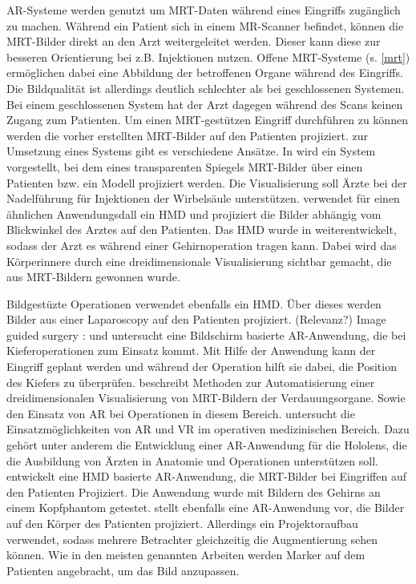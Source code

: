 AR-Systeme werden genutzt um MRT-Daten während eines Eingriffs zugänglich zu machen. Während ein Patient sich in einem MR-Scanner befindet, können die MRT-Bilder direkt an den Arzt weitergeleitet werden. Dieser kann diese zur besseren Orientierung bei z.B. Injektionen nutzen. Offene MRT-Systeme (s. \ref{mrt}) ermöglichen dabei eine Abbildung der betroffenen Organe während des Eingriffs. Die Bildqualität ist allerdings deutlich schlechter als bei geschlossenen Systemen. Bei einem geschlossenen System hat der Arzt dagegen während des Scans keinen Zugang zum Patienten. Um einen MRT-gestützen Eingriff durchführen zu können werden die vorher erstellten MRT-Bilder auf den Patienten projiziert. zur Umsetzung eines Systems gibt es verschiedene Ansätze.
In \cite{Fritz2012} wird ein System vorgestellt, bei dem eines transparenten Spiegels MRT-Bilder über einen Patienten bzw. ein Modell projiziert werden. Die Visualisierung soll Ärzte bei der Nadelführung für Injektionen der Wirbelsäule unterstützen. 
\cite{khamene03} verwendet für einen ähnlichen Anwendungsdall ein HMD und projiziert die Bilder abhängig vom Blickwinkel des Arztes auf den Patienten. Das HMD wurde in \cite{khamene01} weiterentwickelt, sodass der Arzt es während einer Gehirnoperation tragen kann. Dabei wird das Körperinnere durch eine dreidimensionale Visualisierung sichtbar gemacht, die aus MRT-Bildern gewonnen wurde. 

Bildgestüzte Operationen 
\cite{fuchs98} verwendet ebenfalls ein HMD. Über dieses werden Bilder aus einer Laparoscopy auf den Patienten projiziert. (Relevanz?)
Image guided surgery :\cite{grimson99} und  \cite{KerstenOertel2013TheSO}
\cite{MISCHKOWSKI2006478}
\cite{MISCHKOWSKI2006478} untersucht eine Bildschirm basierte AR-Anwendung, die bei Kieferoperationen zum Einsatz kommt. Mit Hilfe der Anwendung kann der Eingriff geplant werden und während der Operation hilft sie dabei, die Position des Kiefers zu überprüfen. 
\cite{Soler04} beschreibt Methoden zur Automatisierung einer dreidimensionalen Visualisierung von MRT-Bildern der Verdauungsorgane. Sowie den Einsatz von AR bei Operationen in diesem Bereich. 
\cite{GasquesRodrigues17} untersucht die Einsatzmöglichkeiten von AR und VR im operativen medizinischen Bereich. Dazu gehört unter anderem die Entwicklung einer AR-Anwendung für die Hololens, die die Ausbildung von Ärzten in Anatomie und Operationen unterstützen soll. 
\cite{Wendt03} entwickelt eine HMD basierte AR-Anwendung, die MRT-Bilder bei Eingriffen auf den Patienten Projiziert. Die Anwendung wurde mit Bildern des Gehirns an einem Kopfphantom getestet.
\cite{Watts17} stellt ebenfalls eine AR-Anwendung vor, die Bilder auf den Körper des Patienten projiziert. Allerdings ein Projektoraufbau verwendet, sodass mehrere Betrachter gleichzeitig die Augmentierung sehen können. Wie in den meisten genannten Arbeiten werden Marker auf dem Patienten angebracht, um das Bild anzupassen.
\cite{Tabrizi15}


